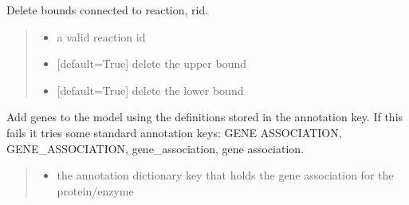\documentclass[letterpaper,12pt,english]{sphinxmanual}
\begin{document}
\begin{fulllineitems}
\begin{fulllineitems}
\label{\detokenize{api/core:cbmpy.CBModel.Model.deleteBoundsForReactionId}}
\pysigstartsignatures
\pysiglinewithargsret
{}
{\sphinxparamcomma {}\sphinxparamcomma {}}
{}
\pysigstopsignatures
\sphinxAtStartPar
Delete bounds connected to reaction, rid.
\begin{quote}\begin{description}
\begin{itemize}
\item {} 
\sphinxAtStartPar
{} \textendash{} a valid reaction id

\item {} 
\sphinxAtStartPar
{} \textendash{} {[}default=True{]} delete the upper bound

\item {} 
\sphinxAtStartPar
{} \textendash{} {[}default=True{]} delete the lower bound

\end{itemize}

\end{description}\end{quote}

\end{fulllineitems}


\begin{fulllineitems}
\label{\detokenize{api/core:cbmpy.CBModel.Model.createGeneAssociationsFromAnnotations}}
\pysigstartsignatures
\pysiglinewithargsret
{}
{\sphinxparamcomma {}}
{}
\pysigstopsignatures
\sphinxAtStartPar
Add genes to the model using the definitions stored in the annotation key. If this fails it tries some standard annotation keys: GENE ASSOCIATION, GENE\_ASSOCIATION, gene\_association, gene association.
\begin{quote}\begin{description}
\begin{itemize}
\item {} 
\sphinxAtStartPar
{} \textendash{} the annotation dictionary key that holds the gene association for the protein/enzyme


\end{itemize}
\end{description}
\end{quote}
\end{fulllineitems}
\end{fulllineitems}
\end{document}
